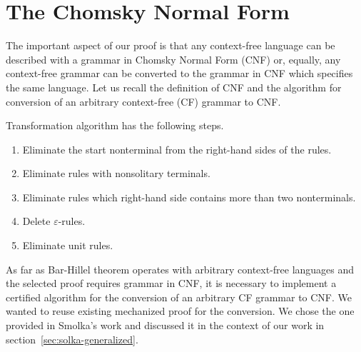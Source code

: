 \section{The Chomsky Normal Form}
\label{sec:cnf}

The important aspect of our proof is that any context-free language can be described with a grammar in Chomsky Normal Form (CNF) or, equally, any context-free grammar can be converted to the grammar in CNF which specifies the same language.
Let us recall the definition of CNF and the algorithm for conversion of an arbitrary context-free (CF) grammar to CNF.

Transformation algorithm has the following steps.
\begin{enumerate}
\item Eliminate the start nonterminal from the right-hand sides of the rules.
\item Eliminate rules with nonsolitary terminals.
\item Eliminate rules which right-hand side contains more than two nonterminals.
\item Delete $\varepsilon$-rules.
\item Eliminate unit rules.
\end{enumerate}

As far as Bar-Hillel theorem operates with arbitrary context-free languages and the selected proof requires grammar in CNF, it is necessary to implement a certified algorithm for the conversion of an arbitrary CF grammar to CNF.
We wanted to reuse existing mechanized proof for the conversion.
We chose the one provided in Smolka's work and discussed it in the context of our work in section~\ref{sec:solka-generalized}.



